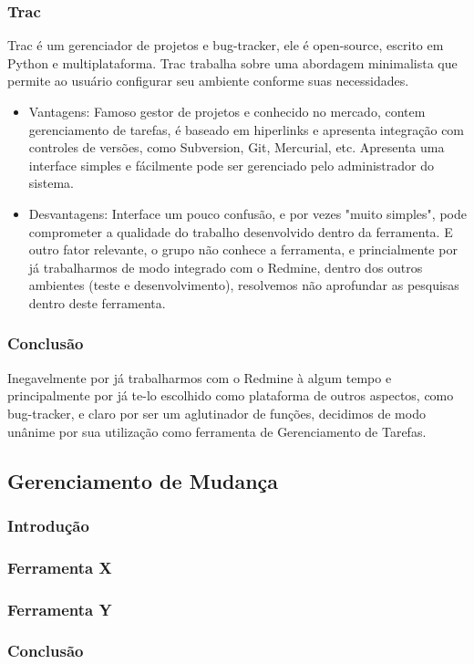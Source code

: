 \documentclass[12pt,a4paper]{article}
\begin{document}
		\subsubsection{Trac}
		
			Trac é um gerenciador de projetos e bug-tracker, ele é open-source, escrito em Python e multiplataforma. Trac trabalha sobre uma abordagem minimalista que permite ao usuário configurar seu ambiente conforme suas necessidades. 
		
		\begin{itemize}
			\item Vantagens: 
				Famoso gestor de projetos e conhecido no mercado, contem gerenciamento de tarefas, é baseado em hiperlinks e apresenta integração com controles de versões, como Subversion, Git, Mercurial, etc. Apresenta uma interface simples e fácilmente pode ser gerenciado pelo administrador do sistema. 
			\item Desvantagens: 
				Interface um pouco confusão, e por vezes "muito simples", pode comprometer a qualidade do trabalho desenvolvido dentro da ferramenta.
				E outro fator relevante, o grupo não conhece a ferramenta, e princialmente por já trabalharmos de modo integrado com o Redmine, dentro dos outros ambientes (teste e desenvolvimento), resolvemos não aprofundar as pesquisas dentro deste ferramenta.
		\end{itemize}
		
		
		\subsubsection{Conclusão}
			Inegavelmente por já trabalharmos com o Redmine à algum tempo e principalmente por já te-lo escolhido como plataforma de outros aspectos, como bug-tracker, e claro por ser um aglutinador de funções, decidimos de modo unânime por sua utilização como ferramenta de Gerenciamento de Tarefas. 
		
		
	\clearpage	
	\subsection{Gerenciamento de Mudança}
		\subsubsection{Introdução}
		\subsubsection{Ferramenta X}
		\subsubsection{Ferramenta Y}
		\subsubsection{Conclusão}
		
		

\clearpage
\nocite{*}
		
		
\end{document}
